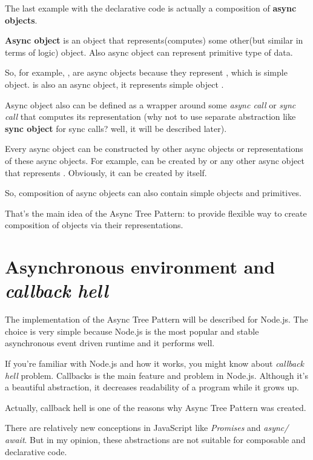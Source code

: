 \documentclass{article}
\begin{document}
The last example with the declarative code is actually a composition of \textbf{async objects}.

\textbf{Async object} is an object that represents(computes) some other(but similar in terms of logic) object. Also async object can represent primitive type of data.

So, for example, ,  are async objects because they represent , which is simple object.  is also an async object, it represents simple object .

Async object also can be defined as a wrapper around some \textit{async call} or \textit{sync call} that computes its representation (why not to use separate abstraction like \textbf{sync object} for sync calls? well, it will be described later).

Every async object can be constructed by other async objects or representations of these async objects. For example,  can be created by  or any other async object that represents . Obviously, it can be created by  itself.

So, composition of async objects can also contain simple objects and primitives.

That's the main idea of the Async Tree Pattern: to provide flexible way to create composition of objects via their representations.

\section{Asynchronous environment and \textit{callback hell}}

The implementation of the Async Tree Pattern will be described for Node.js. The choice is very simple because Node.js is the most popular and stable asynchronous  event driven runtime and it performs well.

If you're familiar with Node.js and how it works, you might know about \textit{callback hell} problem. Callbacks is the main feature and problem in Node.js. Although it's a beautiful abstraction, it decreases readability of a program while it grows up.

Actually, callback hell is one of the reasons why Async Tree Pattern was created.

There are relatively new conceptions in JavaScript like \textit{Promises} and  \textit{async/ await}. But in my opinion, these abstractions are not suitable for composable and declarative code.
\end{document}
